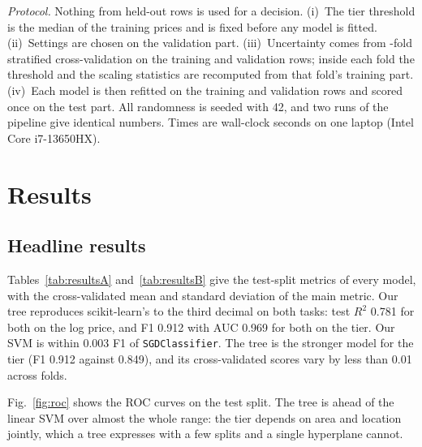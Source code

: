 \documentclass[10pt,twocolumn,a4paper]{article}
\newcommand{\gentable}[1]{\resizebox{\ifdim\width>\linewidth\linewidth\else\width\fi}{!}{}}
\begin{document}
\textit{Protocol.} Nothing from held-out rows is used for a decision.
(i)~The tier threshold is the median of the training prices and is fixed
before any model is fitted. (ii)~Settings are chosen on the validation
part. (iii)~Uncertainty comes from \NumFolds-fold stratified
cross-validation on the training and validation rows; inside each fold the
threshold and the scaling statistics are recomputed from that fold's
training part. (iv)~Each model is then refitted on the training and
validation rows and scored once on the test part. All randomness is seeded
with 42, and two runs of the pipeline give identical numbers. Times are
wall-clock seconds on one laptop (Intel Core i7-13650HX).

\section{Results}
\subsection{Headline results}
Tables~\ref{tab:resultsA} and~\ref{tab:resultsB} give the test-split
metrics of every model, with the cross-validated mean and standard
deviation of the main metric.
Our tree reproduces scikit-learn's to the third decimal on both
tasks: test $R^2$ 0.781 for both on the log price, and F1 0.912 with
AUC 0.969 for both on the tier. Our SVM is within 0.003 F1 of
\texttt{SGDClassifier}. The tree is the stronger model for the tier
(F1 0.912 against 0.849), and its cross-validated scores vary by less
than 0.01 across folds.

\begin{table}[t]
  \centering
  \caption{Task A, price regression on the log price: test split, and
  cross-validated $R^2$ (mean $\pm$ std over \NumFolds{} folds).}
  \label{tab:resultsA}
  \gentable{results_task_a}
\end{table}

\begin{table}[t]
  \centering
  \caption{Task B, price tier: test split, and cross-validated F1
  (mean $\pm$ std over \NumFolds{} folds).}
  \label{tab:resultsB}
  \gentable{results_task_b}
\end{table}

Fig.~\ref{fig:roc} shows the ROC curves on the test split. The tree is
ahead of the linear SVM over almost the whole range: the tier depends on area and
location jointly, which a tree expresses with a few splits and a single
hyperplane cannot.
\end{document}
